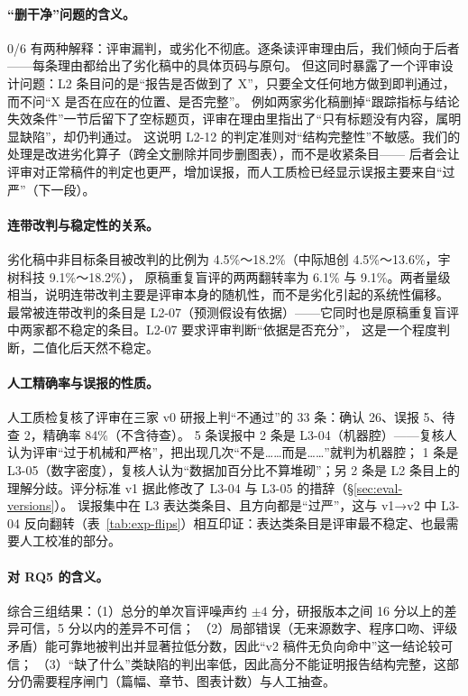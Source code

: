 \paragraph{“删干净”问题的含义。}0/6 有两种解释：评审漏判，或劣化不彻底。逐条读评审理由后，我们倾向于后者——每条理由都给出了劣化稿中的具体页码与原句。
但这同时暴露了一个评审设计问题：L2 条目问的是“报告是否做到了 X”，只要全文任何地方做到即判通过，而不问“X 是否在应在的位置、是否完整”。
例如两家劣化稿删掉“跟踪指标与结论失效条件”一节后留下了空标题页，评审在理由里指出了“只有标题没有内容，属明显缺陷”，却仍判通过。
这说明 L2-12 的判定准则对“结构完整性”不敏感。我们的处理是改进劣化算子（跨全文删除并同步删图表），而不是收紧条目——
后者会让评审对正常稿件的判定也更严，增加误报，而人工质检已经显示误报主要来自“过严”（下一段）。

\paragraph{连带改判与稳定性的关系。}劣化稿中非目标条目被改判的比例为 4.5\%～18.2\%（中际旭创 4.5\%～13.6\%，宇树科技 9.1\%～18.2\%），
原稿重复盲评的两两翻转率为 6.1\% 与 9.1\%。两者量级相当，说明连带改判主要是评审本身的随机性，而不是劣化引起的系统性偏移。
最常被连带改判的条目是 L2-07（预测假设有依据）——它同时也是原稿重复盲评中两家都不稳定的条目。L2-07 要求评审判断“依据是否充分”，
这是一个程度判断，二值化后天然不稳定。

\paragraph{人工精确率与误报的性质。}人工质检复核了评审在三家 v0 研报上判“不通过”的 33 条：确认 26、误报 5、待查 2，精确率 84\%（不含待查）。
5 条误报中 2 条是 L3-04（机器腔）——复核人认为评审“过于机械和严格”，把出现几次“不是……而是……”就判为机器腔；
1 条是 L3-05（数字密度），复核人认为“数据加百分比不算堆砌”；另 2 条是 L2 条目上的理解分歧。评分标准 v1 据此修改了 L3-04 与 L3-05 的措辞（\S\ref{sec:eval-versions}）。
误报集中在 L3 表达类条目、且方向都是“过严”，这与 v1→v2 中 L3-04 反向翻转（表~\ref{tab:exp-flips}）相互印证：表达类条目是评审最不稳定、也最需要人工校准的部分。

\paragraph{对 RQ5 的含义。}综合三组结果：（1）总分的单次盲评噪声约 $\pm4$ 分，研报版本之间 16 分以上的差异可信，5 分以内的差异不可信；
（2）局部错误（无来源数字、程序口吻、评级矛盾）能可靠地被判出并显著拉低分数，因此“v2 稿件无负向命中”这一结论较可信；
（3）“缺了什么”类缺陷的判出率低，因此高分不能证明报告结构完整，这部分仍需要程序闸门（篇幅、章节、图表计数）与人工抽查。

